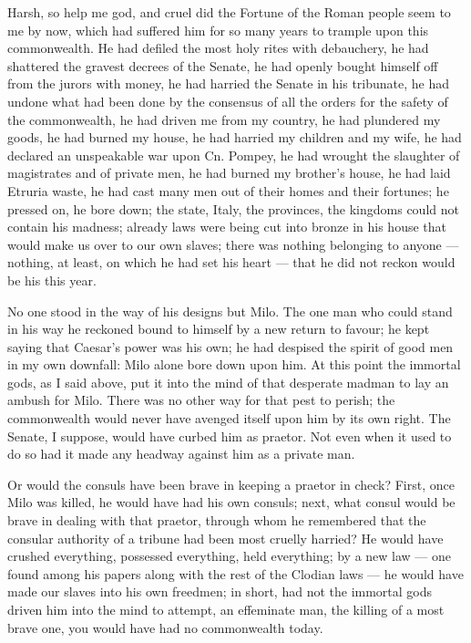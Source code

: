  Harsh, so help me god, and cruel did the Fortune of the Roman people seem to me by now, which had suffered him for so many years to trample upon this commonwealth. He had defiled the most holy rites with debauchery, he had shattered the gravest decrees of the Senate, he had openly bought himself off from the jurors with money, he had harried the Senate in his tribunate, he had undone what had been done by the consensus of all the orders for the safety of the commonwealth, he had driven me from my country, he had plundered my goods, he had burned my house, he had harried my children and my wife, he had declared an unspeakable war upon Cn. Pompey, he had wrought the slaughter of magistrates and of private men, he had burned my brother's house, he had laid Etruria waste, he had cast many men out of their homes and their fortunes; he pressed on, he bore down; the state, Italy, the provinces, the kingdoms could not contain his madness; already laws were being cut into bronze in his house that would make us over to our own slaves; there was nothing belonging to anyone --- nothing, at least, on which he had set his heart --- that he did not reckon would be his this year.

 No one stood in the way of his designs but Milo. The one man who could stand in his way he reckoned bound to himself by a new return to favour; he kept saying that Caesar's power was his own; he had despised the spirit of good men in my own downfall: Milo alone bore down upon him. At this point the immortal gods, as I said above, put it into the mind of that desperate madman to lay an ambush for Milo. There was no other way for that pest to perish; the commonwealth would never have avenged itself upon him by its own right. The Senate, I suppose, would have curbed him as praetor. Not even when it used to do so had it made any headway against him as a private man.

 Or would the consuls have been brave in keeping a praetor in check? First, once Milo was killed, he would have had his own consuls; next, what consul would be brave in dealing with that praetor, through whom he remembered that the consular authority of a tribune had been most cruelly harried? He would have crushed everything, possessed everything, held everything; by a new law --- one found among his papers along with the rest of the Clodian laws --- he would have made our slaves into his own freedmen; in short, had not the immortal gods driven him into the mind to attempt, an effeminate man, the killing of a most brave one, you would have had no commonwealth today.

